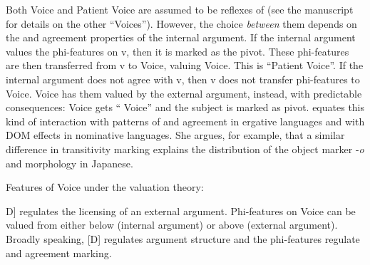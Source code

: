 \begin{exe}
\begin{xlist}
\begin{xlist}
\begin{xlist}
\begin{xlist}
\begin{xlist}
\begin{xlist}
\begin{exe}
\begin{xlist}
\begin{exe}
\begin{exe}
\begin{xlist}
\begin{exe}
\begin{exe}
\begin{xlist}
\begin{exe}
\begin{xlist}
\begin{exe}
\begin{xlist}
\begin{exe}
\begin{xlist}
\begin{exe}
\begin{xlist}
\begin{exe}
\begin{xlist}
\begin{exe}
\begin{xlist}
\begin{exe}
\begin{xlist}
\begin{exe}
\begin{xlist}
\begin{exe}
\begin{xlist}
Both  Voice and Patient Voice are assumed to be reflexes of {\vd} (see the manuscript for details on the other ``Voices''). However, the choice \emph{between} them depends on the  and agreement properties of the internal argument. If the internal argument values the phi-features on v, then it is marked as the pivot. These phi-features are then transferred from v to Voice, valuing Voice. This is ``Patient Voice''. If the internal argument does not agree with v, then v does not transfer phi-features to Voice. Voice has them valued by the external argument, instead, with predictable consequences: Voice gets `` Voice'' and the subject is marked as pivot. \cite{nie17} equates this kind of interaction with patterns of  and agreement in ergative languages and with DOM effects in nominative languages. She argues, for example, that a similar difference in transitivity marking explains the distribution of the object marker -\emph{o} and  morphology in Japanese.
 \begin{exe}
 \ex  Features of Voice under the valuation theory: 
 \begin{xlist} 
 	\ex  {[}D] regulates the licensing of an external argument. 
 	\ex  Phi-features on Voice can be valued from either below (internal argument) or above (external argument). 
 \z
\z 
Broadly speaking, [D] regulates argument structure and the phi-features regulate  and agreement marking.


\end{xlist}
\end{exe}
\end{xlist}
\end{exe}
\end{xlist}
\end{exe}
\end{xlist}
\end{exe}
\end{xlist}
\end{exe}
\end{xlist}
\end{exe}
\end{xlist}
\end{exe}
\end{xlist}
\end{exe}
\end{xlist}
\end{exe}
\end{xlist}
\end{exe}
\end{xlist}
\end{exe}
\end{exe}
\end{xlist}
\end{exe}
\end{exe}
\end{xlist}
\end{exe}
\end{xlist}
\end{xlist}
\end{xlist}
\end{xlist}
\end{xlist}
\end{xlist}
\end{exe}
